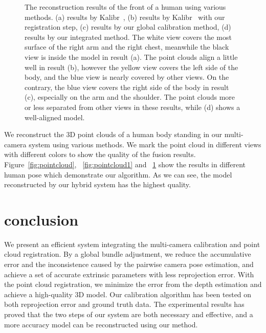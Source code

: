 \begin{figure}[htbp]
{\begin{minipage}[c]{.22\linewidth}
\end{minipage}
}
\caption{The reconstruction results of the front of a human using various methods. (a) results by Kalibr~\cite{Maye2013Self}, (b) results by Kalibr~\cite{Maye2013Self} with our registration step, (c) results by our global calibration method, (d) results by our integrated method. The white view covers the most surface of the right arm and the right chest, meanwhile the black view is inside the model in result (a).  The point clouds align a little well in result (b), however the yellow view covers the left side of the body, and the blue view is nearly covered by other views. On the contrary, the blue view covers the right side of the body in result (c), especially on the arm and the shoulder. The point clouds more or less separated from other views in these results, while (d) shows a well-aligned model.}
\label{fig:pointcloud2}
\end{figure}
We reconstruct the 3D point clouds of a human body standing in our multi-camera system using various methods.  We mark the point cloud in different views with different colors to show the quality of the fusion results. Figure~\ref{fig:pointcloud}, ~\ref{fig:pointcloud1} and ~\ref{fig:pointcloud2} show the results in different human pose which demonstrate our algorithm. As we can see, the model reconstructed by our hybrid system has the highest quality.


\section{conclusion}
We present an efficient system integrating the multi-camera calibration and point cloud registration. By a global bundle adjustment, we reduce the accumulative error and the inconsistence caused by the pairwise camera pose estimation, and achieve a set of accurate extrinsic parameters with less reprojection error. With the point cloud registration, we minimize the error from the depth estimation and achieve a high-quality 3D model. Our calibration algorithm has been tested on both reprojection error and ground truth data. The experimental results has proved that the two steps of our system are both necessary and effective, and a more accuracy model can be reconstructed using our method.



